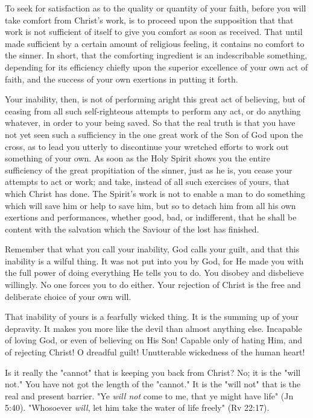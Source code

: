 \documentclass[
]{book}
\begin{document}
To seek for satisfaction as to the quality or quantity of your faith, before you will take comfort from Christ's work, is to proceed upon the supposition that that work is not sufficient of itself to give you comfort as soon as received. That until made sufficient by a certain amount of religious feeling, it contains no comfort to the sinner. In short, that the comforting ingredient is an indescribable something, depending for its efficiency chiefly upon the superior excellence of your own act of faith, and the success of your own exertions in putting it forth.

Your inability, then, is not of performing aright this great act of believing, but of ceasing from all such self-righteous attempts to perform any act, or do anything whatever, in order to your being saved. So that the real truth is that you have not yet seen such a sufficiency in the one great work of the Son of God upon the cross, as to lead you utterly to discontinue your wretched efforts to work out something of your own. As soon as the Holy Spirit shows you the entire sufficiency of the great propitiation of the sinner, just as he is, you cease your attempts to act or work; and take, instead of all such exercises of yours, that which Christ has done. The Spirit's work is not to enable a man to do something which will save him or help to save him, but so to detach him from all his own exertions and performances, whether good, bad, or indifferent, that he shall be content with the salvation which the Saviour of the lost has finished.

Remember that what you call your inability, God calls your guilt, and that this inability is a wilful thing. It was not put into you by God, for He made you with the full power of doing everything He tells you to do. You disobey and disbelieve willingly. No one forces you to do either. Your rejection of Christ is the free and deliberate choice of your own will.

That inability of yours is a fearfully wicked thing. It is the summing up of your depravity. It makes you more like the devil than almost anything else. Incapable of loving God, or even of believing on His Son! Capable only of hating Him, and of rejecting Christ! O dreadful guilt! Unutterable wickedness of the human heart!

Is it really the "cannot" that is keeping you back from Christ? No; it is the "will not." You have not got the length of the "cannot." It is the "will not" that is the real and present barrier. "Ye \emph{will not} come to me, that ye might have life" (Jn 5:40). "Whosoever \emph{will}, let him take the water of life freely" (Rv 22:17).
\end{document}
